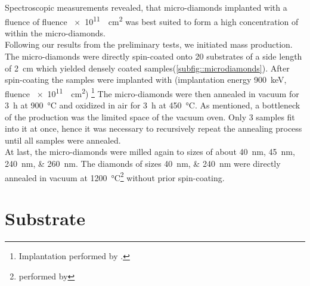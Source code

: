 	Spectroscopic measurements revealed, that micro-diamonds implanted with a fluence of fluence \SI{e11}{\per\centi\meter\squared} was best suited to form a high concentration of \sivs within the micro-diamonds.
	\\
	Following our results from the preliminary tests, we initiated mass production.
	The micro-diamonds were directly spin-coated onto 20 \ir substrates of a side length of \SI{2}{cm} which yielded densely coated samples(\cref{subfig::microdiamonds}).
	After spin-coating the samples were implanted with  (implantation energy \SI{900}{keV}, fluence \SI{e11}{\per\centi\meter\squared}) \footnote{Implantation performed by \klug.}
	The micro-diamonds were then annealed in vacuum for \SI{3}{\hour} at \SI{900}{\celsius} and oxidized in air for \SI{3}{\hour} at \SI{450}{\celsius}.
	As mentioned, a bottleneck of the production was the limited space of the vacuum oven.
	Only 3 samples fit into it at once, hence it was necessary to recursively repeat the annealing process until all samples were annealed.
	\\
	At last, the micro-diamonds were milled again to sizes of about \SIlist{40;45;240;260}{nm}.
	The diamonds of sizes \SIlist{40;240}{nm} were directly annealed in vacuum at \SI{1200}{\celsius}\footnote{performed by \muzha} without prior spin-coating.










\section{\Ir Substrate}\label{sec::ir_substrate}


